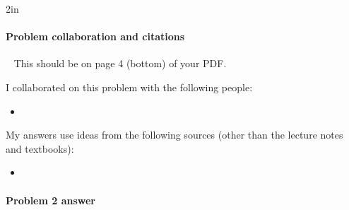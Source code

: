 
\begin{answerBox}{2in}          %

  
  \paragraph{Problem  collaboration and citations}~\GradescopeComment
  {This should be on page 4 (bottom) of your PDF.}

  I collaborated on this problem with the following people:
  \begin{blue}
    \begin{itemize}
      
    \item \REPLACEME            %
      
    \end{itemize}
  \end{blue}

  My answers use ideas from the following sources (other than the lecture notes and textbooks): 
  \begin{blue}
    \begin{itemize}
      
    \item \REPLACEME            %
      
    \end{itemize}
  \end{blue}

\end{answerBox}

\newpage

\paragraph{Problem 2 answer}

